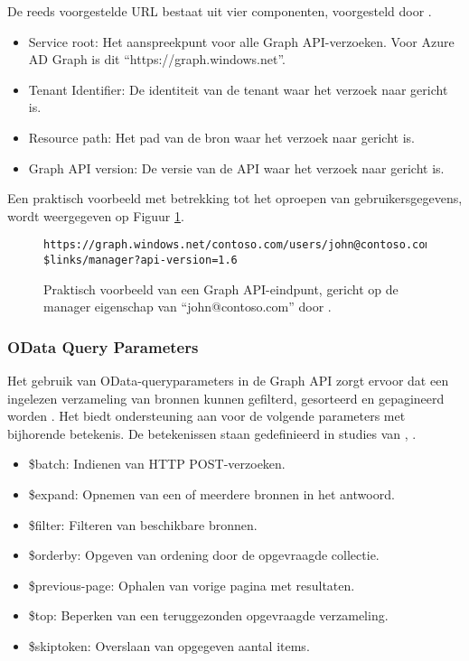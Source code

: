 De reeds voorgestelde \ac{URL} bestaat uit vier componenten, voorgesteld door \textcite{Microsoft2015}.

\begin{itemize}
    \item Service root: Het aanspreekpunt voor alle Graph \ac{API}-verzoeken. Voor Azure \ac{AD} Graph is dit “https://graph.windows.net”.
    \item Tenant Identifier: De identiteit van de tenant waar het verzoek naar gericht is.
    \item Resource path: Het pad van de bron waar het verzoek naar gericht is.
    \item Graph \ac{API} version: De versie van de \ac{API} waar het verzoek naar gericht is.
\end{itemize}

Een praktisch voorbeeld met betrekking tot het oproepen van gebruikersgegevens, wordt weergegeven op Figuur \ref{pfe}. \\

\begin{figure}[h]
    \scriptsize\begin{verbatim}https://graph.windows.net/contoso.com/users/john@contoso.com/
$links/manager?api-version=1.6
    \end{verbatim}    
    \caption[Voorbeeld Graph API-eindpunt]{Praktisch voorbeeld van een Graph \ac{API}-eindpunt, gericht op de manager eigenschap van “john@contoso.com” door \textcite{Microsoft2015}.}
    \label{pfe}
\end{figure}



\subsubsection{OData Query Parameters}

Het gebruik van OData-queryparameters in de Graph \ac{API} zorgt ervoor dat een ingelezen verzameling van bronnen kunnen gefilterd, gesorteerd en gepagineerd worden \autocite{Microsoft2015}. Het biedt ondersteuning aan voor de volgende parameters met bijhorende betekenis. De betekenissen staan gedefinieerd in studies van \textcite{Liang2016}, \textcite{Wojcieszyn2014}. 

\begin{itemize}
    \item \$batch: Indienen van \ac{HTTP} POST-verzoeken.
    \item \$expand: Opnemen van een of meerdere bronnen in het antwoord.
    \item \$filter: Filteren van beschikbare bronnen.
    \item \$orderby: Opgeven van ordening door de opgevraagde collectie.
    \item \$previous-page: Ophalen van vorige pagina met resultaten.
    \item \$top: Beperken van een teruggezonden opgevraagde verzameling.
    \item \$skiptoken: Overslaan van opgegeven aantal items.
\end{itemize}

